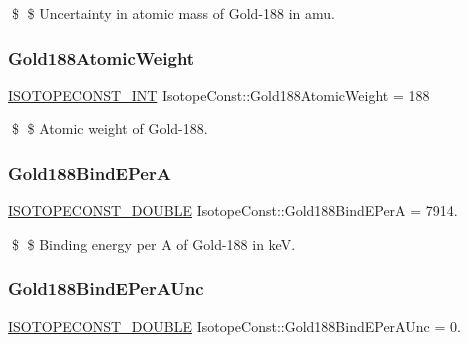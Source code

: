 \$ \$ Uncertainty in atomic mass of Gold-\/188 in amu. \mbox{\label{group___isotope_const-_gold-_au188_gad24d81e19e62a804e068cff79e37937b}} 
\subsubsection{\texorpdfstring{Gold188\+Atomic\+Weight}{Gold188AtomicWeight}}
{\footnotesize\ttfamily \mbox{\hyperlink{group___isotope_const-_macros_ga5f18360b3e99483a35c32d789e62621c}{I\+S\+O\+T\+O\+P\+E\+C\+O\+N\+S\+T\+\_\+\+I\+NT}} Isotope\+Const\+::\+Gold188\+Atomic\+Weight = 188}

\$ \$ Atomic weight of Gold-\/188. \mbox{\label{group___isotope_const-_gold-_au188_gad25e1d1503c2e129b3dccd67dfe5a4f9}} 
\subsubsection{\texorpdfstring{Gold188\+Bind\+E\+PerA}{Gold188BindEPerA}}
{\footnotesize\ttfamily \mbox{\hyperlink{group___isotope_const-_macros_ga8f45a7272ce02c0b4c65c44636ed719a}{I\+S\+O\+T\+O\+P\+E\+C\+O\+N\+S\+T\+\_\+\+D\+O\+U\+B\+LE}} Isotope\+Const\+::\+Gold188\+Bind\+E\+PerA = 7914.}

\$ \$ Binding energy per A of Gold-\/188 in keV. \mbox{\label{group___isotope_const-_gold-_au188_gac59e7bfed68b283c75ffcdff3be3a82c}} 
\subsubsection{\texorpdfstring{Gold188\+Bind\+E\+Per\+A\+Unc}{Gold188BindEPerAUnc}}
{\footnotesize\ttfamily \mbox{\hyperlink{group___isotope_const-_macros_ga8f45a7272ce02c0b4c65c44636ed719a}{I\+S\+O\+T\+O\+P\+E\+C\+O\+N\+S\+T\+\_\+\+D\+O\+U\+B\+LE}} Isotope\+Const\+::\+Gold188\+Bind\+E\+Per\+A\+Unc = 0.}

